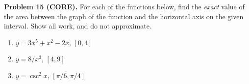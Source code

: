 \documentclass[addpoints]{exam}
\begin{document}
\vspace{0.3in}

\noindent
\textbf{Problem 15  (CORE).} For each of the functions below, find the \emph{exact} value of the area between the graph of the function and the horizontal axis on the given interval. Show all work, and do not approximate.
	\begin{enumerate}
		\item $y = 3x^5 + x^2 - 2x$, $[0,4]$
		\item $y = 8/x^3$, $[4,9]$
		\item $y = \csc^2 x$, $[\pi/6, \pi/4]$
	\end{enumerate}
\end{document}
